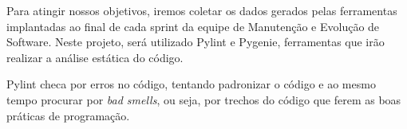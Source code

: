

Para atingir nossos objetivos, iremos coletar os dados gerados pelas ferramentas
implantadas ao final de cada sprint da equipe de Manutenção e Evolução de Software.
Neste projeto, será utilizado Pylint e Pygenie, ferramentas que irão realizar a
análise estática do código.

Pylint checa por erros no código, tentando padronizar o código e ao mesmo tempo
procurar por \textit{bad smells}, ou seja, por trechos do código que ferem as boas
práticas de programação.
